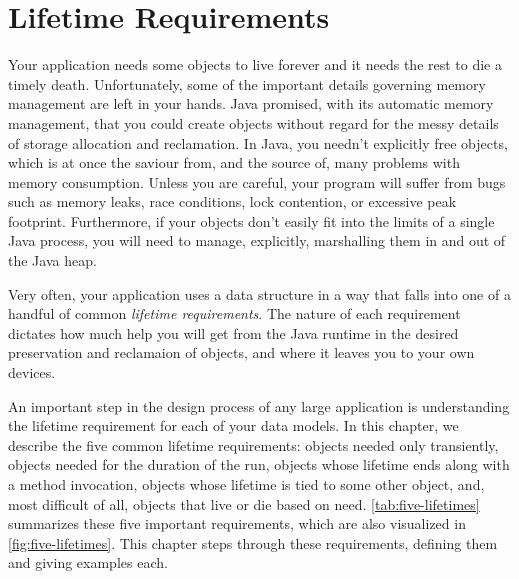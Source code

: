 \chapter{Lifetime Requirements}
\label{chapter:lifetime-requirements}

Your application needs some objects to live forever and it needs the rest to die
a timely death. Unfortunately, some of the important details governing memory
management are left in your hands. Java promised, with its automatic memory
management, that you could create objects without regard for the messy details of
storage allocation and reclamation. In Java, you needn't explicitly free objects,
which is at once the saviour from, and the source of, many problems with memory
consumption. Unless you are careful, your program will suffer from bugs such as
memory leaks, race conditions, lock contention, or excessive
peak footprint. Furthermore, if your objects don't easily fit into the limits of
a single Java process, you will need to manage, explicitly, marshalling them in
and out of the Java heap.

Very often, your application uses a data structure in a way that falls into one
of a handful of common \emph{lifetime requirements}. The
nature of each requirement dictates how much help you will get from the Java runtime
in the desired preservation and reclamaion of objects, and where it leaves you to
your own devices. 

An important step in the design process of any large application is understanding
the lifetime requirement for each of your data models. In this chapter, we
describe the five common lifetime requirements: objects needed only transiently,
objects needed for the duration of the run, objects whose lifetime ends along
with a method invocation, objects whose lifetime is tied to some other object,
and, most difficult of all, objects that live or die based on need.
\autoref{tab:five-lifetimes} summarizes these five important requirements,
which are also visualized in \autoref{fig:five-lifetimes}. This chapter steps
 through these requirements, defining them and giving examples each.

